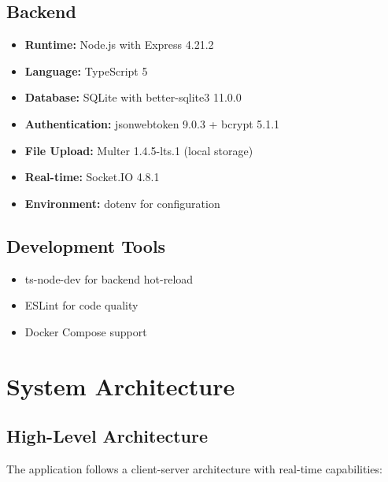 \documentclass[11pt,a4paper]{article}
\begin{document}
\subsection{Backend}
\begin{itemize}[leftmargin=*]
    \item \textbf{Runtime:} Node.js with Express 4.21.2
    \item \textbf{Language:} TypeScript 5
    \item \textbf{Database:} SQLite with better-sqlite3 11.0.0
    \item \textbf{Authentication:} jsonwebtoken 9.0.3 + bcrypt 5.1.1
    \item \textbf{File Upload:} Multer 1.4.5-lts.1 (local storage)
    \item \textbf{Real-time:} Socket.IO 4.8.1
    \item \textbf{Environment:} dotenv for configuration
\end{itemize}

\subsection{Development Tools}
\begin{itemize}[leftmargin=*]
    \item ts-node-dev for backend hot-reload
    \item ESLint for code quality
    \item Docker Compose support
\end{itemize}

\section{System Architecture}

\subsection{High-Level Architecture}
The application follows a client-server architecture with real-time capabilities:
\end{document}
